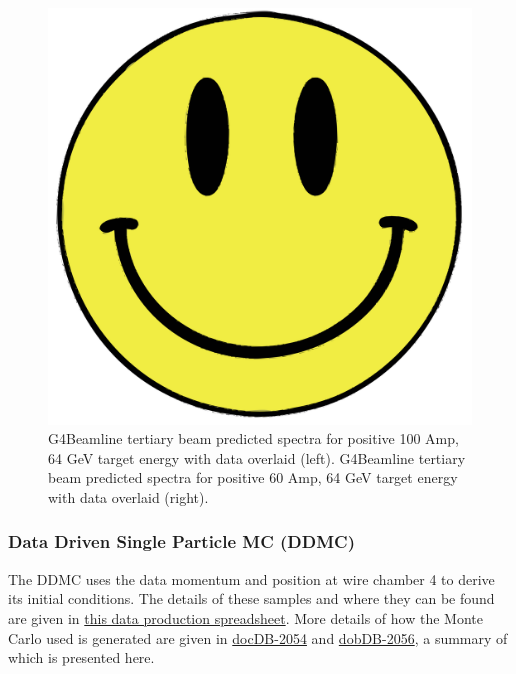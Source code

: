 \begin{figure}[htb]
\begin{center}
\includegraphics[scale=0.05]{images/dummy.png}
\end{center}
\caption{G4Beamline tertiary beam  predicted spectra for positive 100 Amp, 64 GeV target energy with data overlaid (left). G4Beamline tertiary beam  predicted spectra for positive 60 Amp, 64 GeV target energy with data overlaid (right).}
\label{fig:beamspectrum}
\end{figure}



\subsubsection{Data Driven Single Particle MC (DDMC) }\label{sec:DDMCSamples}
The DDMC uses the data momentum and position at wire chamber 4 to derive its initial conditions. The details of these samples and where they can be found are given in \href{https://docs.google.com/spreadsheets/d/1_0kNCKBIIx53f6vopqN2OijtcTICHD9rDvN_YKGH2mI/edit?usp=sharing}{this data production spreadsheet}.
More details of how the Monte Carlo used is generated are given in \href{https://lartpc-docdb.fnal.gov:441/cgi-bin/ShowDocument?docid=2054}{docDB-2054} and  \href{https://lartpc-docdb.fnal.gov:441/cgi-bin/ShowDocument?docid=2056}{dobDB-2056}, a summary of which is presented here. 

